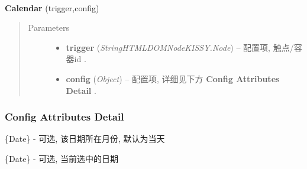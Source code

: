 \documentclass[letterpaper,10pt,english]{sphinxmanual}
\begin{document}
\begin{fulllineitems}
\label{api/component/calendar/index:Calendar.Calendar}~
\begin{DUlineblock}{0em}
\item[] \textbf{Calendar} (trigger,config)
\end{DUlineblock}
\begin{quote}\begin{description}
\item[{Parameters}] \leavevmode\begin{itemize}
\item {}
\textbf{trigger} (\emph{String\textbar{}HTMLDOMNode\textbar{}KISSY.Node}) -- 配置项, 触点/容器id .

\item {}
\textbf{config} (\emph{Object}) -- 配置项, 详细见下方 \textbf{Config Attributes Detail} .

\end{itemize}

\end{description}\end{quote}

\end{fulllineitems}



\subsubsection{Config Attributes Detail}
\label{api/component/calendar/index:config-attributes-detail}

\begin{fulllineitems}
\label{api/component/calendar/index:Calendar.date}
\{Date\} - 可选, 该日期所在月份, 默认为当天

\end{fulllineitems}



\begin{fulllineitems}
\label{api/component/calendar/index:Calendar.selected}
\{Date\} - 可选, 当前选中的日期

\end{fulllineitems}


\end{document}
